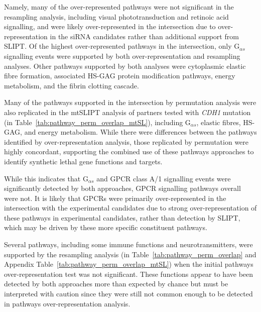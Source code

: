 Namely, many of the over-represented \glspl{pathway} were not significant in the resampling analysis, including visual phototransduction and retinoic acid signalling, and were likely over-represented in the intersection due to over-represent\-ation in the \gls{siRNA} candidates rather than additional support from \gls{SLIPT}. 
Of the highest over-represented \glspl{pathway} in the intersection, only G$_{\alpha s}$ signalling events were supported by both over-represent\-ation and resampling analyses. Other \glspl{pathway} supported by both analyses were cytoplasmic elastic fibre formation, associated HS-GAG protein modification \glspl{pathway}, energy metabolism, and the fibrin clotting cascade.  

Many of the \glspl{pathway} supported in the intersection by permutation analysis were also replicated in the \acrshort{mtSLIPT} analysis of partners tested with \textit{CDH1} \gls{mutation} (in Table~\ref{tab:pathway_perm_overlap_mtSL}), including G$_{\alpha s}$, elastic fibres, HS-GAG, and energy metabolism. While there were differences between the \glspl{pathway} identified by over-representation analysis, those replicated by permutation were highly concordant, supporting the combined use of these \glspl{pathway} approaches to identify \gls{synthetic lethal} gene functions and targets. 

While this indicates that G$_{\alpha s}$ and \gls{GPCR} class A/1 signalling events were significantly detected by both approaches, \gls{GPCR} signalling \glspl{pathway} overall were not. It is likely that \glspl{GPCR} were primarily over-represented in the intersection with the experimental candidates due to strong over-represent\-ation of these \glspl{pathway} in experimental candidates, rather than detection by \gls{SLIPT}, which may be driven by these more specific constituent \glspl{pathway}. 

Several \glspl{pathway}, including some immune functions and neurotransmitters, were supported by the resampling analysis (in Table~\ref{tab:pathway_perm_overlap} and Appendix Table~\ref{tab:pathway_perm_overlap_mtSL}) when the initial \glspl{pathway} over-represent\-ation test was not significant. These functions appear to have been detected by both approaches  more than expected by chance but must be interpreted with caution since they were still not common enough to be detected in \glspl{pathway} over-represent\-ation analysis.

